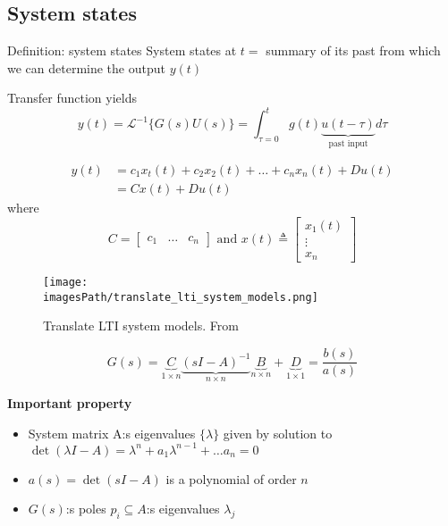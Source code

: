 \subsection{System states}
\begin{definitionblock}{Definition: system states}
   System states at $t=$ summary of its past from which we can determine the output $y(t)$ 

   Transfer function yields 
   \begin{equation*}
       y(t) = \mathcal{L}^{-1}\{ G(s)U(s) \} = \int_{\tau=0}^{t} g(t)\underbrace{u(t-\tau)}_\text{past input} d\tau
   \end{equation*}

   \begin{align*}
       y(t) &= c_1x_t(t) + c_2x_2(t) + \ldots + c_nx_n(t) + Du(t) \\
       &= Cx(t) + Du(t)
   \end{align*}
   where
   \begin{equation*}
       C = \begin{bmatrix} c_1 & \ldots & c_n \end{bmatrix}
        \text{ and } 
        x(t) \triangleq \begin{bmatrix} x_{1}(t) \\ \vdots \\ x_{n} \end{bmatrix}
   \end{equation*}
\end{definitionblock}

\begin{figure}[!h]
    \centering
    \texttt{[image: \\imagesPath/translate\_lti\_system\_models.png]}
    \caption{Translate LTI system models. From \cite{}}
\end{figure}

\begin{equation*}
    G(s) = \underbrace{C}_{1\times n}\underbrace{(sI-A)^{-1}}_{n\times n}
    \underbrace{B}_{n\times n} + \underbrace{D}_{1\times 1} = \frac{b(s)}{a(s)}
\end{equation*}

\textbf{Important property}
\begin{itemize}
    \item System matrix A:s eigenvalues $\{\lambda\}$ given by solution to 
    $\det(\lambda I - A) = \lambda^n + a_1\lambda^{n-1} + \ldots a_n = 0$
    \item $a(s) = \det(sI - A)$ is a polynomial of order $n$
    \item $G(s)$:s poles $p_i \subseteq A$:s eigenvalues $\lambda_j$
\end{itemize}

